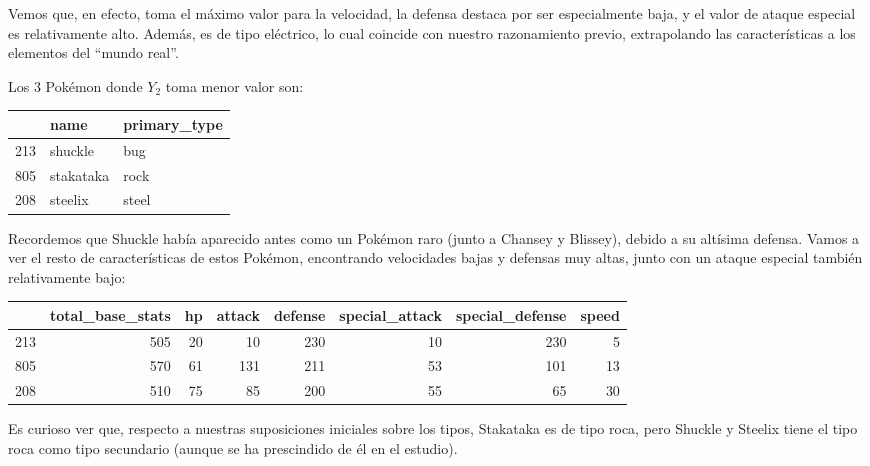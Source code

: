 \documentclass[
  11.8pt,
]{extreport}
\begin{document}
Vemos que, en efecto, toma el máximo valor para la velocidad, la defensa
destaca por ser especialmente baja, y el valor de ataque especial es
relativamente alto. Además, es de tipo eléctrico, lo cual coincide con
nuestro razonamiento previo, extrapolando las características a los
elementos del ``mundo real''.

Los 3 Pokémon donde \(Y_2\) toma menor valor son:

\begin{table}[H]
\centering\begingroup\fontsize{10.5}{12.5}\selectfont

\begin{tabular}{lll}
\toprule
  & name & primary\_type\\
\midrule
213 & shuckle & bug\\
805 & stakataka & rock\\
208 & steelix & steel\\
\bottomrule
\end{tabular}
\endgroup{}
\end{table}

Recordemos que Shuckle había aparecido antes como un Pokémon raro (junto
a Chansey y Blissey), debido a su altísima defensa. Vamos a ver el resto
de características de estos Pokémon, encontrando velocidades bajas y
defensas muy altas, junto con un ataque especial también relativamente
bajo:

\begin{table}[H]
\centering\begingroup\fontsize{9.5}{11.5}\selectfont

\begin{tabular}{lrrrrrrr}
\toprule
  & total\_base\_stats & hp & attack & defense & special\_attack & special\_defense & speed\\
\midrule
213 & 505 & 20 & 10 & 230 & 10 & 230 & 5\\
805 & 570 & 61 & 131 & 211 & 53 & 101 & 13\\
208 & 510 & 75 & 85 & 200 & 55 & 65 & 30\\
\bottomrule
\end{tabular}
\endgroup{}
\end{table}

Es curioso ver que, respecto a nuestras suposiciones iniciales sobre los
tipos, Stakataka es de tipo roca, pero Shuckle y Steelix tiene el tipo
roca como tipo secundario (aunque se ha prescindido de él en el
estudio).
\end{document}
